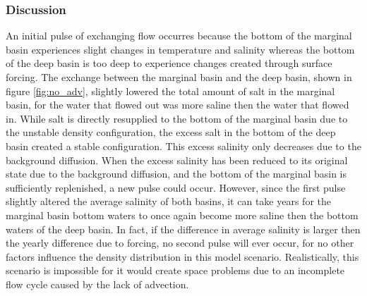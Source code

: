 \documentclass[twocolumn]{article}
\begin{document}
\subsubsection{Discussion}
\label{sect:SS_and_adv_discussion}
An initial pulse of exchanging flow occurres because the bottom of the marginal basin experiences slight changes in temperature and salinity whereas the bottom of the deep basin is too deep to experience changes created through surface forcing. The exchange between the marginal basin and the deep basin, shown in figure \ref{fig:no_adv}, slightly lowered the total amount of salt in the marginal basin, for the water that flowed out was more saline then the water that flowed in. While salt is directly resupplied to the bottom of the marginal basin due to the unstable density configuration, the excess salt in the bottom of the deep basin created a stable configuration. This excess salinity only decreases due to the background diffusion. When the excess salinity has been reduced to its original state due to the background diffusion, and the bottom of the marginal basin is sufficiently replenished, a new pulse could occur. However, since the first pulse slightly altered the average salinity of both basins, it can take years for the marginal basin bottom waters to once again become more saline then the bottom waters of the deep basin. In fact, if the difference in average salinity is larger then the yearly difference due to forcing, no second pulse will ever occur, for no other factors influence the density distribution in this model scenario. Realistically, this scenario is impossible for it would create space problems due to an incomplete flow cycle caused by the lack of advection.
\end{document}
